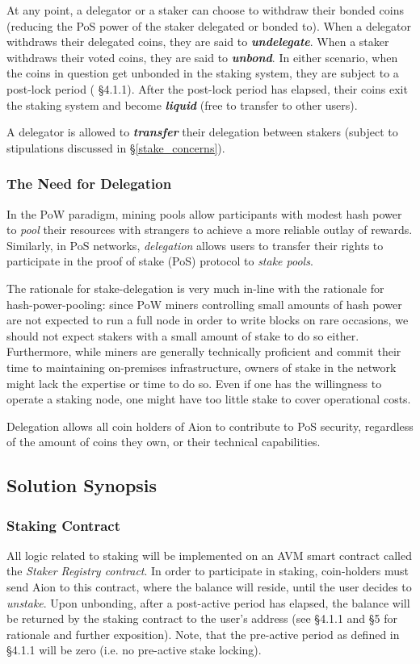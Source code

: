 At any point, a delegator or a staker can choose to withdraw their bonded coins (reducing the PoS power of the staker delegated or bonded to). When a delegator withdraws their delegated coins, they are said to \textbf{\textit{undelegate}}. When a staker withdraws their voted coins, they are said to \textbf{\textit{unbond}}. In either scenario, when the coins in question get unbonded in the staking system, they are subject to a post-lock period (\cite{WZS19} \S4.1.1). After the post-lock period has elapsed, their coins exit the staking system and become \textbf{\textit{liquid}} (free to transfer to other users). 

A delegator is allowed to \textbf{\textit{transfer}} their delegation between stakers (subject to stipulations discussed in \S\ref{stake_concerns}). 

\subsubsection{The Need for Delegation} \label{delegation_overview}
In the PoW paradigm, mining pools allow participants with modest hash power to \textit{pool} their resources with strangers to achieve a more reliable outlay of rewards. Similarly, in PoS networks, \textit{delegation} allows users to transfer their rights to participate in the proof of stake (PoS) protocol to \textit{stake pools}. 

The rationale for stake-delegation is very much in-line with the rationale for hash-power-pooling: since PoW miners controlling small amounts of hash power are not expected to run a full node in order to write blocks on rare occasions, we should not expect stakers with a small amount of stake to do so either. Furthermore, while miners are generally technically proficient and commit their time to maintaining on-premises infrastructure, owners of stake in the network might lack the expertise or time to do so. Even if one has the willingness to operate a staking node, one might have too little stake to cover operational costs. 

Delegation allows all coin holders of Aion to contribute to PoS security, regardless of the amount of coins they own, or their technical capabilities.

\subsection{Solution Synopsis}

\subsubsection{Staking Contract}
All logic related to staking will be implemented on an AVM smart contract called the \textit{Staker Registry contract}. In order to participate in staking, coin-holders must send Aion to this contract, where the balance will reside, until the user decides to \textit{unstake}. Upon unbonding, after a post-active period has elapsed, the balance will be returned by the staking contract to the user's address (see \cite{WZS19} \S4.1.1 and \S5 for rationale and further exposition). Note, that the pre-active period as defined in \cite{WZS19} \S4.1.1 will be zero (i.e. no pre-active stake locking).  

